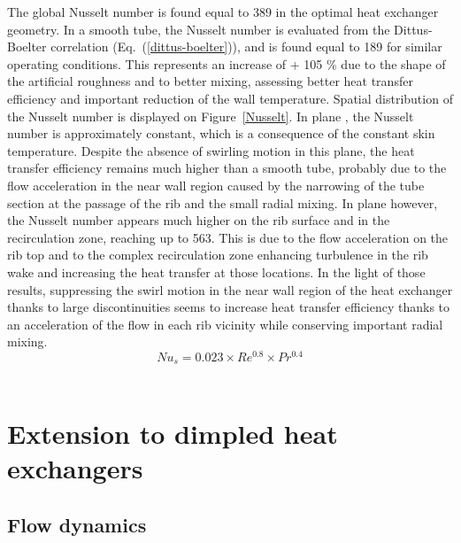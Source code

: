 The global Nusselt number is found equal to 389 in the optimal heat exchanger geometry. In a smooth tube, the Nusselt number is evaluated from the Dittus-Boelter correlation \cite{DittusBoelter1930} (Eq.~(\ref{dittus-boelter})), and is found equal to 189 for similar operating conditions. This represents an increase of + 105 \% due to the shape of the artificial roughness and to better mixing, assessing better heat transfer efficiency and important reduction of the wall temperature. Spatial distribution of the Nusselt number is displayed on Figure~\ref{Nusselt}. In plane , the Nusselt number is approximately constant, which is a consequence of the constant skin temperature. Despite the absence of swirling motion in this plane, the heat transfer efficiency remains much higher than a smooth tube, probably due to the flow acceleration in the near wall region caused by the narrowing of the tube section at the passage of the rib and the small radial mixing. In plane  however, the Nusselt number appears much higher on the rib surface and in the recirculation zone, reaching up to 563. This is due to the flow acceleration on the rib top and to the complex recirculation zone enhancing turbulence in the rib wake and increasing the heat transfer at those locations. In the light of those results, suppressing the swirl motion in the near wall region of the heat exchanger thanks to large discontinuities seems to increase heat transfer efficiency thanks to an acceleration of the flow in each rib vicinity while conserving important radial mixing.\\

\begin{equation}
Nu_s = 0.023 \times Re^{0.8} \times Pr^{0.4}
\label{dittus-boelter}
\end{equation}\\

\section{Extension to dimpled heat exchangers}
\label{sec:discussion}

\subsection{Flow dynamics}
\label{sec:transition_shape}


